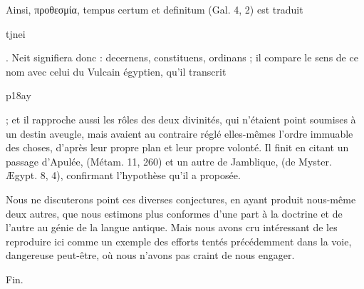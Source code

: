 \documentclass[a4paper, 11pt, oneside]{article}
\begin{document}
Ainsi, προθεσμία, tempus certum et definitum (Gal. 4, 2) est traduit \begin{coptic}tjnei\end{coptic}. Neit signifiera donc : decernens, constituens, ordinans ; il compare le sens de ce nom avec celui du Vulcain égyptien, qu'il transcrit \begin{coptic}p18ay\end{coptic} ; et il rapproche aussi les rôles des deux divinités, qui n'étaient point soumises à un destin aveugle, mais avaient au contraire réglé elles-mêmes l'ordre immuable des choses, d'après leur propre plan et leur propre volonté. Il finit en citant un passage d'Apulée, (Métam. 11, 260) et un autre de Jamblique, (de Myster. Ægypt. 8, 4), confirmant l'hypothèse qu'il a proposée.

Nous ne discuterons point ces diverses conjectures, en ayant produit nous-même deux autres, que nous estimons plus conformes d'une part à la doctrine et de l'autre au génie de la langue antique. Mais nous avons cru intéressant de les reproduire ici comme un exemple des efforts tentés précédemment dans la voie, dangereuse peut-être, où nous n'avons pas craint de nous engager.

Fin.
\end{document}
